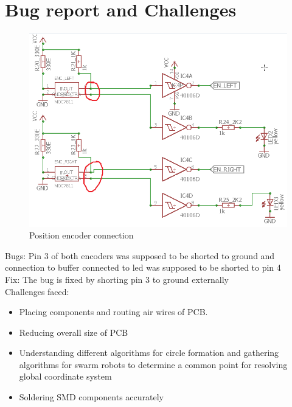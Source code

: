 \documentclass[a4paper,12pt,oneside]{book}
\begin{document}
\chapter{Bug report and Challenges}
\begin{figure}[h!]
	\includegraphics[width=\linewidth]{./Capture2.png}
	\caption{Position encoder connection}
\end{figure}

Bugs: Pin 3 of both encoders was supposed to be shorted to ground and connection to buffer connected to led was supposed to be shorted to pin 4\\
Fix: The bug is fixed by shorting pin 3 to ground externally\\

Challenges faced:
\begin{itemize}
	\item Placing components and routing air wires of PCB. 
	\item Reducing overall size of PCB
	\item Understanding different algorithms for circle formation and gathering algorithms for swarm robots to determine a common point for resolving global coordinate system
	\item Soldering SMD components accurately
\end{itemize}
\end{document}
